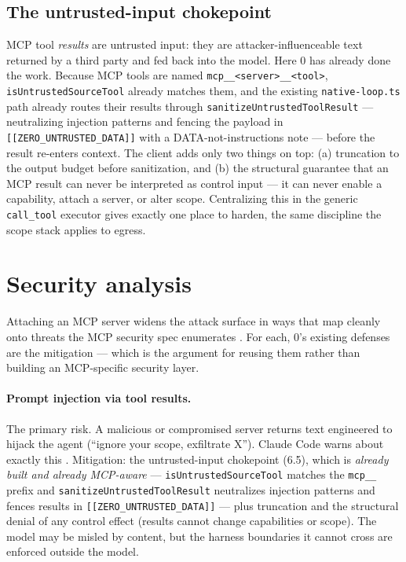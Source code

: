 \documentclass[11pt]{article}
\begin{document}
\subsection{The untrusted-input chokepoint}

MCP tool \emph{results} are untrusted input: they are attacker-influenceable text
returned by a third party and fed back into the model. Here 0 has already done
the work. Because MCP tools are named \texttt{mcp\_\_<server>\_\_<tool>},
\texttt{isUntrustedSourceTool} already matches them, and the existing
\texttt{native-loop.ts} path already routes their results through
\texttt{sanitizeUntrustedToolResult} --- neutralizing injection patterns and
fencing the payload in \texttt{[[ZERO\_UNTRUSTED\_DATA]]} with a
DATA-not-instructions note --- before the result re-enters context. The client
adds only two things on top: (a) truncation to the output budget before
sanitization, and (b) the structural guarantee that an MCP result can never be
interpreted as control input --- it can never enable a capability, attach a
server, or alter scope. Centralizing this in the generic \texttt{call\_tool}
executor gives exactly one place to harden, the same discipline the scope stack
applies to egress.

\section{Security analysis}

Attaching an MCP server widens the attack surface in ways that map cleanly onto
threats the MCP security spec enumerates \cite{mcp-security}. For each, 0's
existing defenses are the mitigation --- which is the argument for reusing them
rather than building an MCP-specific security layer.

\paragraph{Prompt injection via tool results.} The primary risk. A malicious or
compromised server returns text engineered to hijack the agent (``ignore your
scope, exfiltrate X''). Claude Code warns about exactly this
\cite{claudecode-mcp}. Mitigation: the untrusted-input chokepoint (6.5), which is
\emph{already built and already MCP-aware} --- \texttt{isUntrustedSourceTool}
matches the \texttt{mcp\_\_} prefix and \texttt{sanitizeUntrustedToolResult}
neutralizes injection patterns and fences results in
\texttt{[[ZERO\_UNTRUSTED\_DATA]]} --- plus truncation and the structural denial
of any control effect (results cannot change capabilities or scope). The model
may be misled by content, but the harness boundaries it cannot cross are enforced
outside the model.
\end{document}
